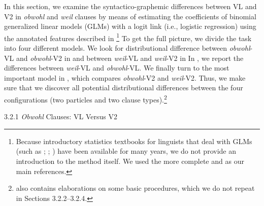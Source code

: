\begin{styleMoutonText}
In this section, we examine the syntactico-graphemic differences between VL and V2 in \textit{obwohl} and \textit{weil} clauses by means of estimating the coefficients of binomial generalized linear models (GLMs) with a logit link (i.e., logistic regression) using the annotated features described in \footnote{Because introductory statistics textbooks for linguists that deal with GLMs (such as \citealt{Baayen2008}; \citealt{Johnson2008}; \citealt{Gries2013}) have been available for many years, we do not provide an introduction to the method itself. We used the more complete \citet{FahrmeirEtAl2013} and \citet{ZuurEtAl2009} as our main references.} To get the full picture, we divide the task into four different models. We look for distributional difference between \textit{obwohl}{}-VL and \textit{obwohl}{}-V2 in  and between \textit{weil}{}-VL and \textit{weil}{}-V2 in  In , we report the differences between \textit{weil}{}-VL and \textit{obwohl}{}-VL. We finally turn to the most important model in , which compares \textit{obwohl}{}-V2 and \textit{weil}{}-V2. Thus, we make sure that we discover all potential distributional differences between the four configurations (two particles and two clause types).\footnote{ also contains elaborations on some basic procedures, which we do not repeat in Sections 3.2.2–3.2.4.}
\end{styleMoutonText}

\begin{styleMoutonHeadingii}
3.2.1  \textit{Obwohl} Clauses: VL Versus V2
\end{styleMoutonHeadingii}

